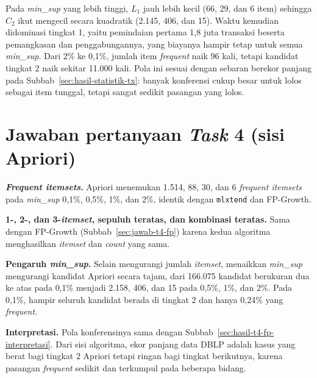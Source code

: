 Pada \textit{min\_sup} yang lebih tinggi, $L_1$ jauh lebih kecil (66, 29, dan 6 item) sehingga $C_2$ ikut mengecil secara kuadratik (2.145, 406, dan 15). Waktu kemudian didominasi tingkat 1, yaitu pemindaian pertama 1,8 juta transaksi beserta pemangkasan dan penggabungannya, yang biayanya hampir tetap untuk semua \textit{min\_sup}. Dari 2\% ke 0,1\%, jumlah item \textit{frequent} naik 96 kali, tetapi kandidat tingkat 2 naik sekitar 11.000 kali. Pola ini sesuai dengan sebaran berekor panjang pada Subbab~\ref{sec:hasil-statistik-tx}: banyak konferensi cukup besar untuk lolos sebagai item tunggal, tetapi sangat sedikit pasangan yang lolos.

\section{Jawaban pertanyaan \textit{Task} 4 (sisi Apriori)}
\label{sec:jawab-t4-apriori}
\textbf{\textit{Frequent itemsets}.} Apriori menemukan 1.514, 88, 30, dan 6 \textit{frequent itemsets} pada \textit{min\_sup} 0,1\%, 0,5\%, 1\%, dan 2\%, identik dengan \texttt{mlxtend} dan FP-Growth.

\textbf{1-, 2-, dan 3-\textit{itemset}, sepuluh teratas, dan kombinasi teratas.} Sama dengan FP-Growth (Subbab~\ref{sec:jawab-t4-fp}) karena kedua algoritma menghasilkan \textit{itemset} dan \textit{count} yang sama.

\textbf{Pengaruh \textit{min\_sup}.} Selain mengurangi jumlah \textit{itemset}, menaikkan \textit{min\_sup} mengurangi kandidat Apriori secara tajam, dari 166.075 kandidat berukuran dua ke atas pada 0,1\% menjadi 2.158, 406, dan 15 pada 0,5\%, 1\%, dan 2\%. Pada 0,1\%, hampir seluruh kandidat berada di tingkat 2 dan hanya 0,24\% yang \textit{frequent}.

\textbf{Interpretasi.} Pola konferensinya sama dengan Subbab~\ref{sec:hasil-t4-fp-interpretasi}. Dari sisi algoritma, ekor panjang data DBLP adalah kasus yang berat bagi tingkat 2 Apriori tetapi ringan bagi tingkat berikutnya, karena pasangan \textit{frequent} sedikit dan terkumpul pada beberapa bidang.
